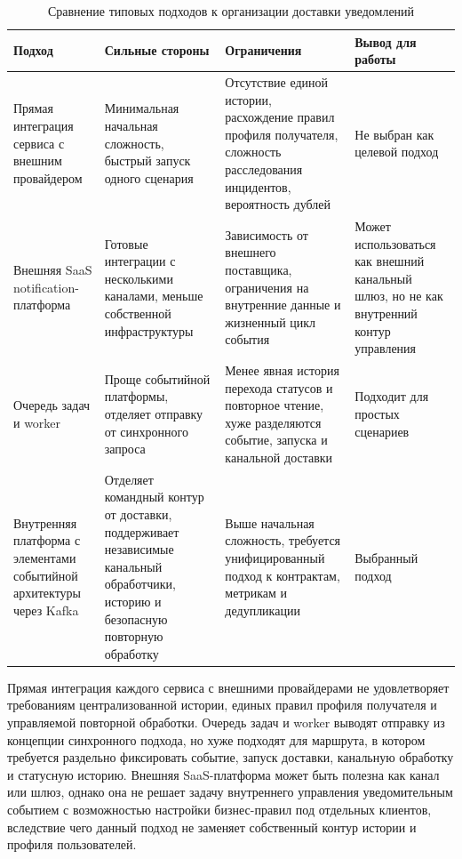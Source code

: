 \begin{table}[H]
    \centering
    \footnotesize
    \renewcommand{\arraystretch}{1.15}
    \caption{Сравнение типовых подходов к организации доставки уведомлений}
    \label{tab:notification-approaches}
    \begin{tabular}{|L{0.22\textwidth}|L{0.20\textwidth}|L{0.27\textwidth}|L{0.21\textwidth}|}
        \hline
        \textbf{Подход} & \textbf{Сильные стороны} & \textbf{Ограничения} & \textbf{Вывод для работы} \\
        \hline
        Прямая интеграция сервиса с внешним провайдером & Минимальная начальная сложность, быстрый запуск одного сценария & Отсутствие единой истории, расхождение правил профиля получателя, сложность расследования инцидентов, вероятность дублей & Не выбран как целевой подход \\
        \hline
        Внешняя SaaS notification-платформа & Готовые интеграции с несколькими каналами, меньше собственной инфраструктуры & Зависимость от внешнего поставщика, ограничения на внутренние данные и жизненный цикл события & Может использоваться как внешний канальный шлюз, но не как внутренний контур управления \\
        \hline
        Очередь задач и worker & Проще событийной платформы, отделяет отправку от синхронного запроса & Менее явная история перехода статусов и повторное чтение, хуже разделяются событие, запуска и канальной доставки & Подходит для простых сценариев \\
        \hline
        Внутренняя платформа с элементами событийной архитектуры через Kafka & Отделяет командный контур от доставки, поддерживает независимые канальный обработчики, историю и безопасную повторную обработку & Выше начальная сложность, требуется унифицированный подход к контрактам, метрикам и дедупликации & Выбранный подход \\
        \hline
    \end{tabular}
\end{table}

Прямая интеграция каждого сервиса с внешними провайдерами не удовлетворяет требованиям централизованной истории, единых правил профиля получателя и управляемой повторной обработки. Очередь задач и worker выводят отправку из концепции синхронного подхода, но хуже подходят для маршрута, в котором требуется раздельно фиксировать событие, запуск доставки, канальную обработку и статусную историю. Внешняя SaaS-платформа может быть полезна как канал или шлюз, однако она не решает задачу внутреннего управления уведомительным событием с возможностью настройки бизнес-правил под отдельных клиентов, вследствие чего данный подход не заменяет собственный контур истории и профиля пользователей.

